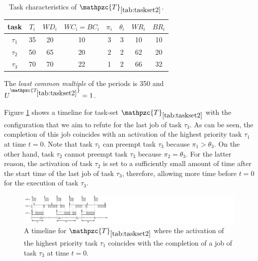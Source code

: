 \documentclass[conference,compsoc]{IEEEtran}
\begin{document}

\begin{table}[h]
	\center
	\caption{Task characteristics of $\mathpzc{T}_{\ref{tab:taskset2}}$.}
	\label{tab:taskset2}
	\begin{tabular}{c | c c c c c | c c}
		\hline 
		task & $T_i$ & $WD_i$ & $WC_i=BC_i$ & $\pi_i$ & $\theta_i$ &  $WR_i$ & $BR_i$\\ 
		\hline 
		$\tau_1$& 35 & 20 & 10 & 3 & 3 &  10 & 10\\ 
		$\tau_2$& 50 & 65 & 20 & 2 & 2 &  62 & 20\\ 
		$\tau_3$& 70 & 70 & 22 & 1 & 2 &  66 & 32\\
		\hline 
	\end{tabular}
	\small
	\item The \textit{least common multiple} of the periods is 350 and $U^{\mathpzc{T_{\ref{tab:taskset2}}}}=1$.
\end{table}

Figure \ref{fig:fpps_fact1} shows a timeline for task-set $\mathpzc{T}_{\ref{tab:taskset2}}$ with the configuration that we aim to refute for the last job of task $\tau_3$. As can be seen, the completion of this job coincides with an activation of the highest priority task $\tau_1$ at time $t=0$. Note that task $\tau_1$ can preempt task $\tau_3$ because $\pi_1 > \theta_3$. On the other hand, task $\tau_2$ cannot preempt task $\tau_3$ because $\pi_2 = \theta_3$. For the latter reason, the activation of task $\tau_2$ is set to a sufficiently small amount of time after the start time of the last job of task $\tau_3$, therefore, allowing more time before $t=0$ for the execution of task $\tau_3$.


\begin{figure}[h]
	\centering
	\includegraphics[width=1.1\linewidth]{fig/fpps_fact1}
	\caption{A timeline for $\mathpzc{T}_{\ref{tab:taskset2}}$ where the activation of the highest priority task $\tau_1$ coincides with the completion of a job of task $\tau_3$ at time $t=0$.}
	\label{fig:fpps_fact1}
\end{figure}
\end{document}
